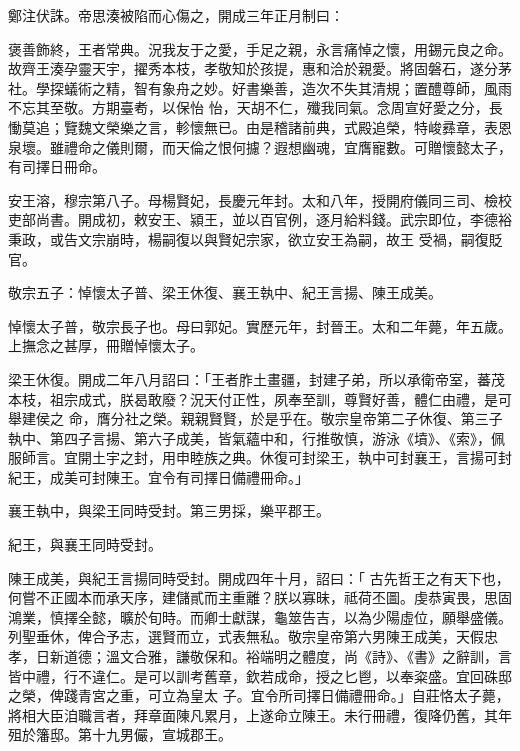 \begin{pinyinscope}
 鄭注伏誅。帝思湊被陷而心傷之，開成三年正月制曰：



 褒善飾終，王者常典。況我友于之愛，手足之親，永言痛悼之懷，用錫元良之命。故齊王湊孕靈天宇，擢秀本枝，孝敬知於孩提，惠和洽於親愛。將固磐石，遂分茅社。學探蟻術之精，智有象舟之妙。好書樂善，造次不失其清規；置醴尊師，風雨不忘其至敬。方期臺耇，以保怡
 怡，天胡不仁，殲我同氣。念周宣好愛之分，長慟莫追；覽魏文榮樂之言，軫懷無已。由是稽諸前典，式殿追榮，特峻彞章，表恩泉壞。雖禮命之儀則爾，而天倫之恨何攄？遐想幽魂，宜膺寵數。可贈懷懿太子，有司擇日冊命。



 安王溶，穆宗第八子。母楊賢妃，長慶元年封。太和八年，授開府儀同三司、檢校吏部尚書。開成初，敕安王、潁王，並以百官例，逐月給料錢。武宗即位，李德裕秉政，或告文宗崩時，楊嗣復以與賢妃宗家，欲立安王為嗣，故王
 受禍，嗣復貶官。



 敬宗五子：悼懷太子普、梁王休復、襄王執中、紀王言揚、陳王成美。



 悼懷太子普，敬宗長子也。母曰郭妃。實歷元年，封晉王。太和二年薨，年五歲。上撫念之甚厚，冊贈悼懷太子。



 梁王休復。開成二年八月詔曰：「王者胙土畫疆，封建子弟，所以承衛帝室，蕃茂本枝，祖宗成式，朕曷敢廢？況天付正性，夙奉至訓，尊賢好善，體仁由禮，是可舉建侯之
 命，膺分社之榮。親親賢賢，於是乎在。敬宗皇帝第二子休復、第三子執中、第四子言揚、第六子成美，皆氣蘊中和，行推敬慎，游泳《墳》、《索》，佩服師言。宜開土宇之封，用申睦族之典。休復可封梁王，執中可封襄王，言揚可封紀王，成美可封陳王。宜令有司擇日備禮冊命。」



 襄王執中，與梁王同時受封。第三男採，樂平郡王。



 紀王，與襄王同時受封。



 陳王成美，與紀王言揚同時受封。開成四年十月，詔曰：「
 古先哲王之有天下也，何嘗不正國本而承天序，建儲貳而主重離？朕以寡昧，祗荷丕圖。虔恭寅畏，思固鴻業，慎擇全懿，曠於旬時。而卿士獻謀，龜筮告吉，以為少陽虛位，願舉盛儀。列聖垂休，俾合予志，選賢而立，式表無私。敬宗皇帝第六男陳王成美，天假忠孝，日新道德；溫文合雅，謙敬保和。裕端明之體度，尚《詩》、《書》之辭訓，言皆中禮，行不違仁。是可以訓考舊章，欽若成命，授之匕鬯，以奉粢盛。宜回硃邸之榮，俾踐青宮之重，可立為皇太
 子。宜令所司擇日備禮冊命。」自莊恪太子薨，將相大臣洎職言者，拜章面陳凡累月，上遂命立陳王。未行冊禮，復降仍舊，其年殂於籓邸。第十九男儼，宣城郡王。




\end{pinyinscope}
